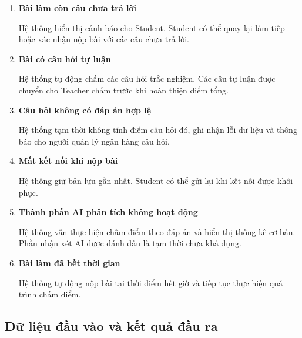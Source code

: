 \begin{enumerate}[label=\textbf{A\arabic*.}]
	\item \textbf{Bài làm còn câu chưa trả lời}
	
	Hệ thống hiển thị cảnh báo cho Student. Student có thể quay lại làm
	tiếp hoặc xác nhận nộp bài với các câu chưa trả lời.
	
	\item \textbf{Bài có câu hỏi tự luận}
	
	Hệ thống tự động chấm các câu hỏi trắc nghiệm. Các câu tự luận được
	chuyển cho Teacher chấm trước khi hoàn thiện điểm tổng.
	
	\item \textbf{Câu hỏi không có đáp án hợp lệ}
	
	Hệ thống tạm thời không tính điểm câu hỏi đó, ghi nhận lỗi dữ liệu và
	thông báo cho người quản lý ngân hàng câu hỏi.
	
	\item \textbf{Mất kết nối khi nộp bài}
	
	Hệ thống giữ bản lưu gần nhất. Student có thể gửi lại khi kết nối
	được khôi phục.
	
	\item \textbf{Thành phần AI phân tích không hoạt động}
	
	Hệ thống vẫn thực hiện chấm điểm theo đáp án và hiển thị thống kê cơ
	bản. Phần nhận xét AI được đánh dấu là tạm thời chưa khả dụng.
	
	\item \textbf{Bài làm đã hết thời gian}
	
	Hệ thống tự động nộp bài tại thời điểm hết giờ và tiếp tục thực hiện
	quá trình chấm điểm.
\end{enumerate}

\subsection{Dữ liệu đầu vào và kết quả đầu ra}

